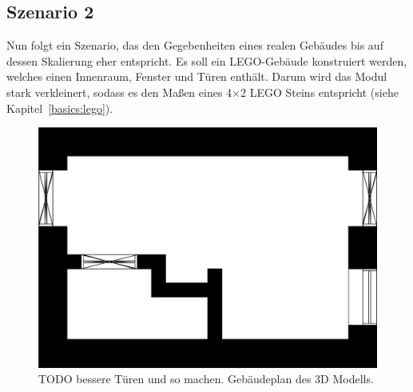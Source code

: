 \subsection{Szenario 2}\label{scenarios:scenario2}
Nun folgt ein Szenario, das den Gegebenheiten eines realen Gebäudes bis auf dessen Skalierung eher entspricht.
Es soll ein LEGO-Gebäude konstruiert werden, welches einen Innenraum, Fenster und Türen enthält.
Darum wird das Modul stark verkleinert, sodass es den Maßen eines 4$\times$2 LEGO Steins entspricht (siehe Kapitel~\ref{basics:lego}).

\begin{figure}[ht]
  \centering
  \includegraphics[width=0.505\columnwidth]{fig/scenario1_story_plan.jpg}
  \caption{TODO bessere Türen und so machen. Gebäudeplan des 3D Modells.}\label{fig:scenarios:Scenario2 Gebaeudeplan}
\end{figure}

